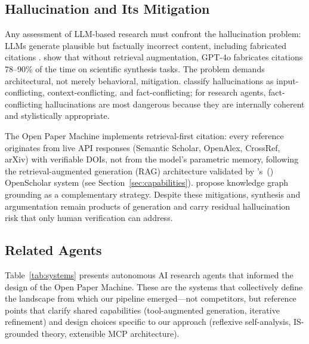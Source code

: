 \documentclass{article}
\begin{document}
\subsection{Hallucination and Its Mitigation}

Any assessment of LLM-based research must confront the hallucination problem: LLMs generate plausible but factually incorrect content, including fabricated citations \citep{alkaissi2023hallucinations,zhang2025hallucination}. \citet{asai2024openscholar} show that without retrieval augmentation, GPT-4o fabricates citations 78--90\% of the time on scientific synthesis tasks. The problem demands architectural, not merely behavioral, mitigation. \citet{zhang2025hallucination} classify hallucinations as input-conflicting, context-conflicting, and fact-conflicting; for research agents, fact-conflicting hallucinations are most dangerous because they are internally coherent and stylistically appropriate.

The Open Paper Machine implements retrieval-first citation: every reference originates from live API responses (Semantic Scholar, OpenAlex, CrossRef, arXiv) with verifiable DOIs, not from the model's parametric memory, following the retrieval-augmented generation (RAG) architecture validated by \citeauthor{asai2024openscholar}'s~(\citeyear{asai2024openscholar}) OpenScholar system (see Section~\ref{sec:capabilities}). \citet{guan2024knowledge} propose knowledge graph grounding as a complementary strategy. Despite these mitigations, synthesis and argumentation remain products of generation and carry residual hallucination risk that only human verification can address.

\subsection{Related Agents}

Table~\ref{tab:systems} presents autonomous AI research agents that informed the design of the Open Paper Machine. These are the systems that collectively define the landscape from which our pipeline emerged---not competitors, but reference points that clarify shared capabilities (tool-augmented generation, iterative refinement) and design choices specific to our approach (reflexive self-analysis, IS-grounded theory, extensible MCP architecture).
\end{document}
